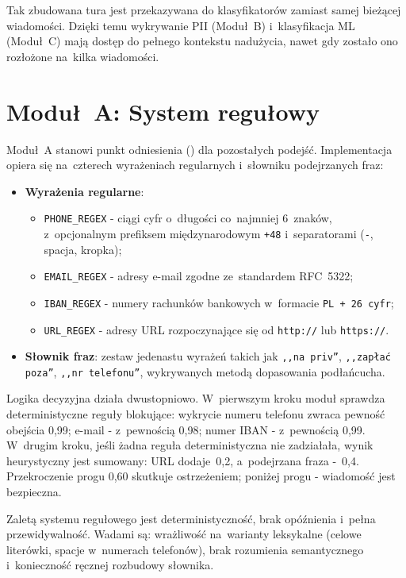 Tak zbudowana tura jest przekazywana do klasyfikatorów
zamiast samej bieżącej wiadomości. Dzięki temu wykrywanie PII
(Moduł~B) i~klasyfikacja ML (Moduł~C) mają dostęp do pełnego
kontekstu nadużycia, nawet gdy zostało ono rozłożone na~kilka
wiadomości.

\section{Moduł~A: System regułowy}
\label{sec:modul-a}

Moduł~A stanowi punkt odniesienia () dla pozostałych
podejść. Implementacja opiera się na~czterech wyrażeniach regularnych i~słowniku podejrzanych
fraz:

\begin{itemize}
  \item \textbf{Wyrażenia regularne}:
    \begin{itemize}
      \item \texttt{PHONE\_REGEX} - ciągi cyfr o~długości co~najmniej
        6~znaków, z~opcjonalnym prefiksem międzynarodowym \texttt{+48}
        i~separatorami (\texttt{-}, spacja, kropka);
      \item \texttt{EMAIL\_REGEX} - adresy e-mail zgodne ze~standardem RFC~5322;
      \item \texttt{IBAN\_REGEX} - numery rachunków bankowych w~formacie
        \texttt{PL + 26 cyfr};
      \item \texttt{URL\_REGEX} - adresy URL rozpoczynające się od
        \texttt{http://} lub \texttt{https://}.
    \end{itemize}

  \item \textbf{Słownik fraz}: zestaw jedenastu wyrażeń takich jak
    \texttt{,,na priv''}, \texttt{,,zapłać poza''}, \texttt{,,nr telefonu''},
    wykrywanych metodą dopasowania podłańcucha.
\end{itemize}

Logika decyzyjna działa dwustopniowo. W~pierwszym kroku moduł sprawdza
deterministyczne reguły blokujące: wykrycie numeru telefonu zwraca
pewność obejścia 0,99; e-mail - z~pewnością 0,98; numer IBAN
- z~pewnością 0,99. W~drugim kroku, jeśli żadna reguła deterministyczna
nie zadziałała, wynik heurystyczny jest sumowany: URL dodaje~0,2,
a~podejrzana fraza -~0,4. Przekroczenie progu 0,60 skutkuje
ostrzeżeniem; poniżej progu - wiadomość jest bezpieczna.

Zaletą systemu regułowego jest deterministyczność, brak opóźnienia
i~pełna przewidywalność. Wadami są: wrażliwość na~warianty leksykalne
(celowe literówki, spacje w~numerach telefonów), brak rozumienia
semantycznego i~konieczność ręcznej rozbudowy słownika.

